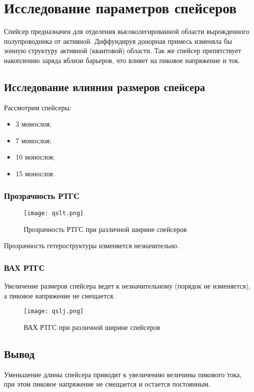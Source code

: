 \section{Исследование параметров спейсеров}
Спейсер предназначен для отделения высоколегированной области вырожденного полупроводника от активной. Диффундируя донорная примесь изменяла бы зонную структуру активной (квантовой) области. Так же спейсер препятствует накоплению заряда вблизи барьеров, что влияет на пиковое напряжение и ток.
\subsection{Исследование влияния размеров спейсера}
Рассмотрим спейсеры: 
\begin{itemize}
	\item 3 монослоя;
	\item 7 монослоя;
	\item 10 монослоя;
	\item 15 монослоя.
\end{itemize}
\subsubsection{Прозрачность РТГС}

\begin{figure}[h]
	\centering
	\texttt{[image: qslt.png]}
	\caption{Прозрачность РТГС при различной ширине спейсеров}
	\label{fig:qslt}
\end{figure}

Прозрачность гетероструктуры изменяется незначительно.

\subsubsection{ВАХ РТГС}
Увеличение размеров спейсера ведет к незначительному (порядок не изменяется), а пиковое напряжение не смещается.

\begin{figure}[h!]
	\centering
	\texttt{[image: qslj.png]}
	\caption{ВАХ РТГС при различной ширине спейсеров}
	\label{fig:qslj}
\end{figure}

\subsection{Вывод}
Уменьшение длины спейсера приводит к увеличению величины пикового тока, при этом пиковое напряжение не смещается и остается постоянным.
